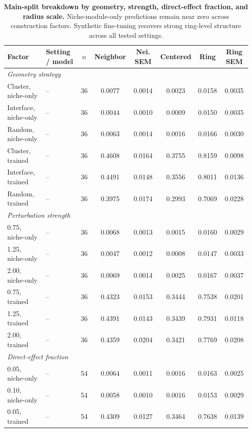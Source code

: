 \documentclass[sigconf,anonymous,review]{acmart}
\begin{document}
\begin{table}[t]
\centering
\small
\setlength{\tabcolsep}{4pt}
\renewcommand{\arraystretch}{1.08}
\caption{\textbf{Main-split breakdown by geometry, strength, direct-effect fraction, and radius scale.}
Niche-module-only predictions remain near zero across construction factors. Synthetic fine-tuning
recovers strong ring-level structure across all tested settings.}
\label{tab:synthetic_lr_factor_breakdown}
\begin{tabular}{llcccccc}
\toprule
Factor & Setting / model & $n$ & Neighbor & Nei. SEM & Centered & Ring & Ring SEM \\
\midrule
\multicolumn{8}{l}{\textit{Geometry strategy}} \\
Cluster, niche-only & -- & 36 & 0.0077 & 0.0014 & 0.0023 & 0.0158 & 0.0035 \\
Interface, niche-only & -- & 36 & 0.0044 & 0.0010 & 0.0009 & 0.0150 & 0.0035 \\
Random, niche-only & -- & 36 & 0.0063 & 0.0014 & 0.0016 & 0.0166 & 0.0030 \\
Cluster, trained & -- & 36 & 0.4608 & 0.0164 & 0.3755 & 0.8159 & 0.0098 \\
Interface, trained & -- & 36 & 0.4491 & 0.0148 & 0.3556 & 0.8011 & 0.0136 \\
Random, trained & -- & 36 & 0.3975 & 0.0174 & 0.2993 & 0.7069 & 0.0228 \\
\midrule
\multicolumn{8}{l}{\textit{Perturbation strength}} \\
0.75, niche-only & -- & 36 & 0.0068 & 0.0013 & 0.0015 & 0.0160 & 0.0029 \\
1.25, niche-only & -- & 36 & 0.0047 & 0.0012 & 0.0008 & 0.0147 & 0.0033 \\
2.00, niche-only & -- & 36 & 0.0069 & 0.0014 & 0.0025 & 0.0167 & 0.0037 \\
0.75, trained & -- & 36 & 0.4323 & 0.0153 & 0.3444 & 0.7538 & 0.0201 \\
1.25, trained & -- & 36 & 0.4391 & 0.0143 & 0.3439 & 0.7931 & 0.0118 \\
2.00, trained & -- & 36 & 0.4359 & 0.0204 & 0.3421 & 0.7769 & 0.0208 \\
\midrule
\multicolumn{8}{l}{\textit{Direct-effect fraction}} \\
0.05, niche-only & -- & 54 & 0.0064 & 0.0011 & 0.0016 & 0.0163 & 0.0025 \\
0.10, niche-only & -- & 54 & 0.0058 & 0.0010 & 0.0016 & 0.0153 & 0.0029 \\
0.05, trained & -- & 54 & 0.4309 & 0.0127 & 0.3464 & 0.7638 & 0.0139 \\

\end{tabular}
\end{table}
\end{document}
